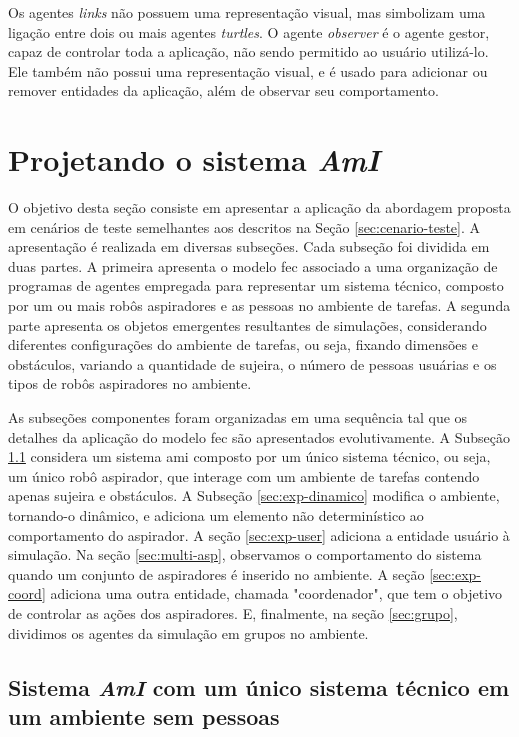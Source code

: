 Os agentes \textit{links} não possuem uma representação visual, mas simbolizam uma ligação entre dois ou mais agentes \textit{turtles}. O agente \textit{observer} é o agente gestor, capaz de controlar toda a aplicação, não sendo permitido ao usuário utilizá-lo. Ele também não possui uma representação visual, e é usado para adicionar ou remover entidades da aplicação, além de observar seu comportamento. 

\section{Projetando o sistema \textit{AmI}}
\label{sec:dev-experimento}

O objetivo desta seção consiste em apresentar a aplicação da abordagem proposta em cenários de teste semelhantes aos descritos na Seção \ref{sec:cenario-teste}. A apresentação é realizada em diversas subseções. Cada subseção foi dividida em duas partes. A primeira apresenta o modelo \acrshort{fec} associado a uma organização de programas de agentes empregada para representar um sistema técnico, composto por um ou mais robôs aspiradores e as pessoas no ambiente de tarefas. A segunda parte apresenta os objetos emergentes resultantes de simulações, considerando diferentes configurações do ambiente de tarefas, ou seja, fixando dimensões e obstáculos, variando a quantidade de sujeira, o número de pessoas usuárias e os tipos de robôs aspiradores no ambiente.

As subseções componentes foram organizadas em uma sequência tal que os detalhes da aplicação do modelo \acrshort{fec} são apresentados evolutivamente. A Subseção \ref{subsec:exp1} considera um sistema \acrshort{ami} composto por um único sistema técnico, ou seja, um único robô aspirador, que interage com um ambiente de tarefas contendo apenas sujeira e obstáculos. A Subseção \ref{sec:exp-dinamico} modifica o ambiente, tornando-o dinâmico, e adiciona um elemento não determinístico ao comportamento do aspirador. A seção \ref{sec:exp-user} adiciona a entidade usuário à simulação. Na seção \ref{sec:multi-asp}, observamos o comportamento do sistema quando um conjunto de aspiradores é inserido no ambiente. A seção \ref{sec:exp-coord} adiciona uma outra entidade, chamada "coordenador", que tem o objetivo de controlar as ações dos aspiradores. E, finalmente, na seção \ref{sec:grupo}, dividimos os agentes da simulação em grupos no ambiente.

\subsection{Sistema \textit{AmI} com um único sistema técnico em um ambiente sem pessoas}
\label{subsec:exp1}

